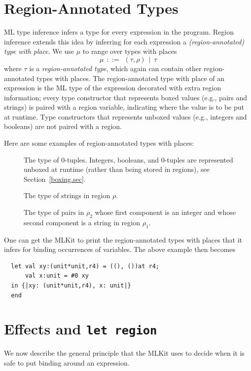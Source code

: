 \documentclass[12pt]{book}
\begin{document}
\section{Region-Annotated Types}
\label{reganntypes.sec}
ML type inference infers a type for every expression in the program.
Region inference extends this idea by inferring for each expression a
%
%
{\em (region-annotated) type with place}. We use $\mu$ to range over
types with places
$$\mu ~~ ::= ~~ (\tau,\rho)~~|~~\tau$$
where $\tau$ is a {\em region-annotated type},
which again can contain other region-annotated types with places. The
region-annotated type with place of an expression is the ML type of
the expression decorated with extra region information; every type
constructor that represents boxed values (e.g., pairs and strings) is
paired with a region variable, indicating where the value is to be put
at runtime. Type constructors that represents unboxed values (e.g.,
integers and booleans) are not paired with a region.
%
%
%

Here are some examples of region-annotated types with places:
\begin{description}
\item[] The type of 0-tuples.  Integers,
  booleans, and 0-tuples are represented
  unboxed at runtime (rather than being stored in regions), see
  Section~\ref{boxing.sec}.
\item[] The type of strings in region
  $\rho$.
\item[] The type of pairs in $\rho_2$ whose first
  component is an integer and whose second component is a string in
  region $\rho_1$.
\end{description}

One can get the MLKit to print the region-annotated types with places
that it infers for binding occurrences of variables.  The above
example then becomes
\begin{verbatim}
  let val xy:(unit*unit,r4) = ((), ())at r4;
      val x:unit = #0 xy
  in {|xy: (unit*unit,r4), x: unit|}
  end
\end{verbatim}

\section{Effects and \texttt{let region}}
\label{effects.sec}
We now describe the general principle that the MLKit uses to decide when
it is safe to put
%
 binding around an expression.
\end{document}
